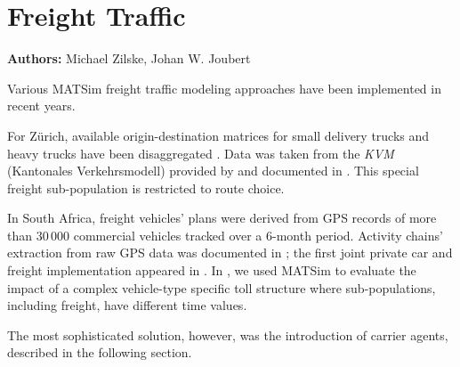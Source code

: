 \chapter{Freight Traffic}
\label{ch:freight}

\hfill \textbf{Authors:} Michael Zilske, Johan W. Joubert




Various MATSim freight traffic modeling approaches have been implemented in recent years. 

For Zürich, available origin-destination matrices for small delivery trucks and heavy trucks have been disaggregated \citet[][]{ShahM_TechRep_IVT_2010}. Data was taken from the \emph{KVM} (Kantonales Verkehrsmodell) provided by \citet{AMV_Webpage_2011} and documented in \citet[][]{GottardiBuergler_SV_1999}. This special freight sub-population is restricted to route choice.

In South Africa, freight vehicles' plans were derived from GPS records of more than 30\,000 commercial vehicles tracked over a 6-month period.  Activity chains' extraction from raw GPS data was documented in \citet[][]{JoubertAxhausen_JTG_2011}; the first joint private car and freight implementation  appeared in \citet[][]{JoubertJEtAl_TRR_2010}. In \citet[][]{NagelKickhoeferJoubert2014HeterogeneousVoTsPROCEDIA}, we used MATSim to evaluate the impact of a complex vehicle-type specific toll structure where sub-populations, including freight, have different time values.

The most sophisticated solution, however, was the introduction of carrier agents, described in the following section. 

